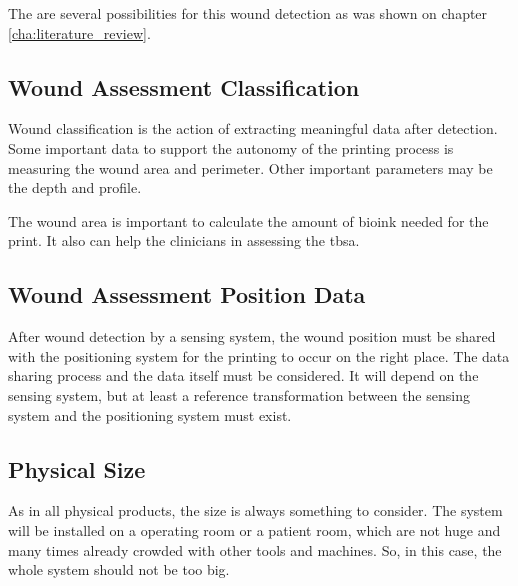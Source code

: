 The are several possibilities for this wound detection as was shown on chapter \ref{cha:literature_review}.


\subsection{Wound Assessment Classification}
\label{subsec:system_architecture_requirements_wound_assessment_classification}

Wound classification is the action of extracting meaningful data after detection. Some important data to support the autonomy of the printing process is measuring the wound area and perimeter. Other important parameters may be the depth and profile.

The wound area is important to calculate the amount of bioink needed for the print. It also can help the clinicians in assessing the \gls{tbsa}. 


\subsection{Wound Assessment Position Data}
\label{subsec:system_architecture_requirements_wound_assessment_position_sharing}

After wound detection by a sensing system, the wound position must be shared with the positioning system for the printing to occur on the right place. The data sharing process and the data itself must be considered. It will depend on the sensing system, but at least a reference transformation between the sensing system and the positioning system must exist.


\subsection{Physical Size}
\label{subsec:system_architecture_requirements_physical_size}

As in all physical products, the size is always something to consider. The system will be installed on a operating room or a patient room, which are not huge and many times already crowded with other tools and machines. So, in this case, the whole system should not be too big.

